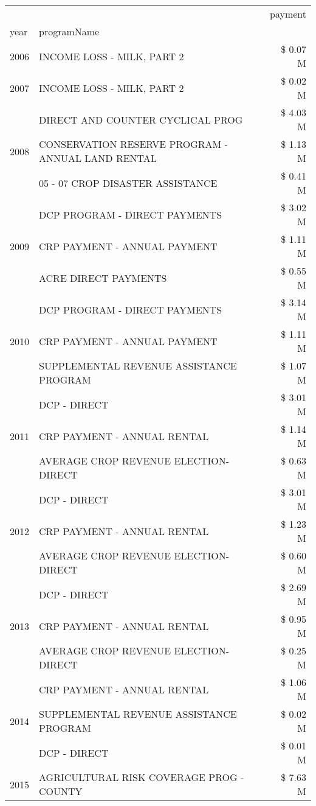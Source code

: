 \begin{tabular}{llr}
\toprule
 &  & payment \\
year & programName &  \\
\midrule
2006 & INCOME LOSS - MILK, PART 2 & \$ 0.07 M \\
\cline{1-3}
2007 & INCOME LOSS - MILK, PART 2 & \$ 0.02 M \\
\cline{1-3}
\multirow[t]{3}{*}{2008} & DIRECT AND COUNTER CYCLICAL PROG & \$ 4.03 M \\
 & CONSERVATION RESERVE PROGRAM - ANNUAL LAND RENTAL & \$ 1.13 M \\
 & 05 - 07 CROP DISASTER ASSISTANCE & \$ 0.41 M \\
\cline{1-3}
\multirow[t]{3}{*}{2009} & DCP PROGRAM - DIRECT PAYMENTS & \$ 3.02 M \\
 & CRP PAYMENT - ANNUAL PAYMENT & \$ 1.11 M \\
 & ACRE DIRECT PAYMENTS & \$ 0.55 M \\
\cline{1-3}
\multirow[t]{3}{*}{2010} & DCP PROGRAM - DIRECT PAYMENTS & \$ 3.14 M \\
 & CRP PAYMENT - ANNUAL PAYMENT & \$ 1.11 M \\
 & SUPPLEMENTAL REVENUE ASSISTANCE PROGRAM & \$ 1.07 M \\
\cline{1-3}
\multirow[t]{3}{*}{2011} & DCP - DIRECT & \$ 3.01 M \\
 & CRP PAYMENT - ANNUAL RENTAL & \$ 1.14 M \\
 & AVERAGE CROP REVENUE ELECTION-DIRECT & \$ 0.63 M \\
\cline{1-3}
\multirow[t]{3}{*}{2012} & DCP - DIRECT & \$ 3.01 M \\
 & CRP PAYMENT - ANNUAL RENTAL & \$ 1.23 M \\
 & AVERAGE CROP REVENUE ELECTION-DIRECT & \$ 0.60 M \\
\cline{1-3}
\multirow[t]{3}{*}{2013} & DCP - DIRECT & \$ 2.69 M \\
 & CRP PAYMENT - ANNUAL RENTAL & \$ 0.95 M \\
 & AVERAGE CROP REVENUE ELECTION-DIRECT & \$ 0.25 M \\
\cline{1-3}
\multirow[t]{3}{*}{2014} & CRP PAYMENT - ANNUAL RENTAL & \$ 1.06 M \\
 & SUPPLEMENTAL REVENUE ASSISTANCE PROGRAM & \$ 0.02 M \\
 & DCP - DIRECT & \$ 0.01 M \\
\cline{1-3}
\multirow[t]{2}{*}{2015} & AGRICULTURAL RISK COVERAGE PROG - COUNTY & \$ 7.63 M \\

\end{tabular}
